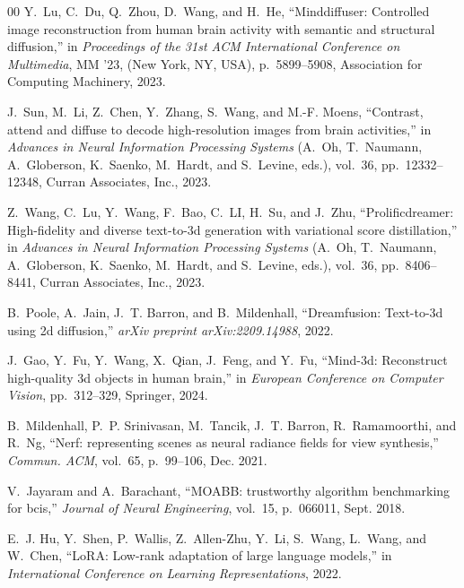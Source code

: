 \documentclass[conference]{IEEEtran}
\begin{document}
\begin{thebibliography}{00}
 Y.~Lu, C.~Du, Q.~Zhou, D.~Wang, and H.~He, ``Minddiffuser: Controlled image reconstruction from human brain activity with semantic and structural diffusion,'' in {\em Proceedings of the 31st ACM International Conference on Multimedia}, MM '23, (New York, NY, USA), p.~5899–5908, Association for Computing Machinery, 2023.




 J.~Sun, M.~Li, Z.~Chen, Y.~Zhang, S.~Wang, and M.-F. Moens, ``Contrast, attend and diffuse to decode high-resolution images from brain activities,'' in {\em Advances in Neural Information Processing Systems} (A.~Oh, T.~Naumann, A.~Globerson, K.~Saenko, M.~Hardt, and S.~Levine, eds.), vol.~36, pp.~12332--12348, Curran Associates, Inc., 2023.

 Z.~Wang, C.~Lu, Y.~Wang, F.~Bao, C.~LI, H.~Su, and J.~Zhu, ``Prolificdreamer: High-fidelity and diverse text-to-3d generation with variational score distillation,'' in {\em Advances in Neural Information Processing Systems} (A.~Oh, T.~Naumann, A.~Globerson, K.~Saenko, M.~Hardt, and S.~Levine, eds.), vol.~36, pp.~8406--8441, Curran Associates, Inc., 2023.


 B.~Poole, A.~Jain, J.~T. Barron, and B.~Mildenhall, ``Dreamfusion: Text-to-3d using 2d diffusion,'' {\em arXiv preprint arXiv:2209.14988}, 2022.


 J.~Gao, Y.~Fu, Y.~Wang, X.~Qian, J.~Feng, and Y.~Fu, ``Mind-3d: Reconstruct high-quality 3d objects in human brain,'' in {\em European Conference on Computer Vision}, pp.~312--329, Springer, 2024.

 B.~Mildenhall, P.~P. Srinivasan, M.~Tancik, J.~T. Barron, R.~Ramamoorthi, and R.~Ng, ``Nerf: representing scenes as neural radiance fields for view synthesis,'' {\em Commun. ACM}, vol.~65, p.~99–106, Dec. 2021.


 V.~Jayaram and A.~Barachant, ``MOABB: trustworthy algorithm benchmarking for bcis,'' {\em Journal of Neural Engineering}, vol.~15, p.~066011, Sept. 2018.


 E.~J. Hu, Y.~Shen, P.~Wallis, Z.~Allen-Zhu, Y.~Li, S.~Wang, L.~Wang, and W.~Chen, ``Lo{RA}: Low-rank adaptation of large language models,'' in {\em International Conference on Learning Representations}, 2022.





\end{thebibliography}
\end{document}
